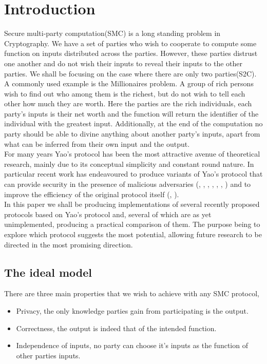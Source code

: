 \documentclass[a4paper,11pt]{article}
\begin{document}
	\section{Introduction}
		Secure multi-party computation(SMC) is a long standing problem in Cryptography. We have a set of parties who wish to cooperate to compute some function on inputs distributed across the parties. However, these parties distrust one another and do not wish their inputs to reveal their inputs to the other parties. We shall be focusing on the case where there are only two parties(S2C).\\

		A commonly used example is the Millionaires problem. A group of rich persons wish to find out who among them is the richest, but do not wish to tell each other how much they are worth. Here the parties are the rich individuals, each party's inputs is their net worth and the function will return the identifier of the individual with the greatest input. Additionally, at the end of the computation no party should be able to divine anything about another party's inputs, apart from what can be inferred from their own input and the output.\\

		For many years Yao's protocol \cite{YaoOriginal} has been the most attractive avenue of theoretical research, mainly due to its conceptual simplicity and constant round nature. In particular recent work has endeavoured to produce variants of Yao's protocol that can provide security in the presence of malicious adversaries (\cite{LindellAndPinkas2007}, \cite{LindellAndPinkas2011}, \cite{Lindell_CnC_2013}, \cite{Katz_Symm_CnC_2013}, \cite{OnCommittedInputs}, \cite{LEGO_Paper}, \cite{MiniLEGO}) and to improve the efficiency of the original protocol itself (\cite{SMC_Is_Practical}, \cite{FreeXOR}).\\



		In this paper we shall be producing implementations of several recently proposed protocols based on Yao's protocol and, several of which are as yet unimplemented, producing a practical comparison of them. The purpose being to explore which protocol suggests the most potential, allowing future research to be directed in the most promising direction.

		\subsection{The ideal model}
			There are three main properties that we wish to achieve with any SMC protocol,
			\begin{itemize}
				\item Privacy, the only knowledge parties gain from participating is the output.
				\item Correctness, the output is indeed that of the intended function.
				\item Independence of inputs, no party can choose it's inputs as the function of other parties inputs.
			\end{itemize}
\end{document}
